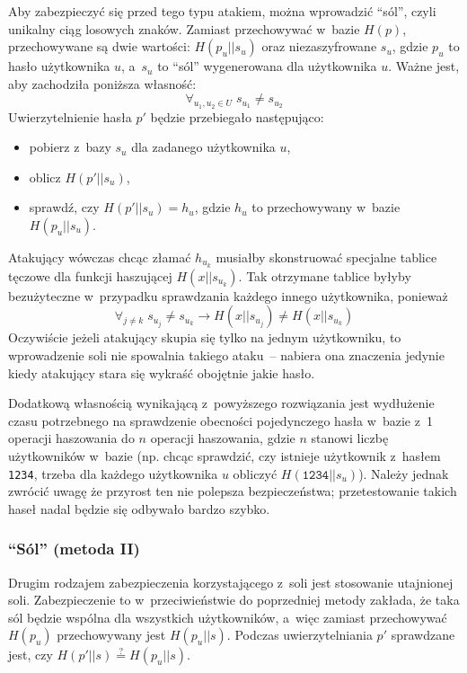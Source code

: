 Aby zabezpieczyć się przed tego typu atakiem, można wprowadzić ``sól'', czyli
unikalny ciąg losowych znaków. Zamiast przechowywać w~bazie $H(p)$,
przechowywane są dwie wartości: $H(p_u || s_u)$ oraz niezaszyfrowane $s_u$,
gdzie $p_u$ to hasło użytkownika $u$, a~$s_u$ to ``sól'' wygenerowana dla
użytkownika $u$. Ważne jest, aby zachodziła poniższa własność:
    $$\forall_{u_1, u_2 \in U} \; s_{u_1} \neq s_{u_2}$$
Uwierzytelnienie hasła $p'$ będzie przebiegało następująco:

\begin{itemize}
\item pobierz z~bazy $s_u$ dla zadanego użytkownika $u$,
\item oblicz $H(p'||s_u)$,
\item sprawdź, czy $H(p'||s_u) = h_u$, gdzie $h_u$ to przechowywany w~bazie
$H(p_u||s_u)$.
\end{itemize}

Atakujący wówczas chcąc złamać $h_{u_k}$ musiałby skonstruować specjalne
tablice tęczowe dla funkcji haszującej $H(x||s_{u_k})$. Tak otrzymane tablice
byłyby bezużyteczne w~przypadku sprawdzania każdego innego użytkownika,
ponieważ
    $$\forall_{j \neq k} \; s_{u_j} \neq s_{u_k} \rightarrow H(x||s_{u_j}) \neq
    H(x||s_{u_k})$$
Oczywiście jeżeli atakujący skupia się tylko na jednym użytkowniku, to
wprowadzenie soli nie spowalnia takiego ataku~-- nabiera ona znaczenia jedynie
kiedy atakujący stara się wykraść obojętnie jakie hasło.

Dodatkową własnością wynikającą z~powyższego rozwiązania jest wydłużenie czasu
potrzebnego na sprawdzenie obecności pojedynczego hasła w~bazie z~1 operacji
haszowania do $n$ operacji haszowania, gdzie $n$ stanowi liczbę użytkowników
w~bazie (np. chcąc sprawdzić, czy istnieje użytkownik z~hasłem \texttt{1234},
trzeba dla każdego użytkownika $u$ obliczyć $H(\texttt{1234}||s_u)$). Należy
jednak zwrócić uwagę że przyrost ten nie polepsza  bezpieczeństwa;
przetestowanie takich haseł nadal będzie się odbywało bardzo szybko.

\label{salt_2}
\subsubsection{``Sól'' (metoda II)}
Drugim rodzajem zabezpieczenia korzystającego z~soli jest stosowanie utajnionej
soli. Zabezpieczenie to w~przeciwieństwie do poprzedniej metody zakłada, że
taka sól będzie wspólna dla wszystkich użytkowników, a~więc zamiast
przechowywać $H(p_u)$ przechowywany jest $H(p_u||s)$. Podczas uwierzytelniania
$p'$ sprawdzane jest, czy $H(p'||s) \stackrel{?}{=} H(p_u||s)$.

